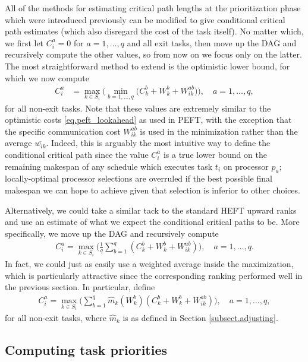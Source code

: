 \documentclass[12pt]{article}
\begin{document}
All of the methods for estimating critical path lengths at the prioritization phase which were introduced previously can be modified to give conditional critical path estimates (which also disregard the cost of the task itself). No matter which, we first let $C_i^a = 0$ for $a = 1, \dots, q$ and all exit tasks, then move up the DAG and recursively compute the other values, so from now on we focus only on the latter. The most straightforward method to extend is the optimistic lower bound, for which we now compute 
\begin{align}
C_i^a &= \max_{k \in S_i} \bigg( \min_{b = 1, \dots, q} \big( C_k^b + W_k^b + W_{ik}^{ab} \big)  \bigg), \quad a = 1, \dots, q, \label{eq.opt_lookahead} 
\end{align}
for all non-exit tasks. Note that these values are extremely similar to the optimistic costs \eqref{eq.peft_lookahead} as used in PEFT, with the exception that the specific communication cost $W_{ik}^{ab}$ is used in the minimization rather than the average $\overline{w_{ik}}$. Indeed, this is arguably the most intuitive way to define the conditional critical path since the value $C_i^a$ is a true lower bound on the remaining makespan of any schedule which executes task $t_i$ on processor $p_a$; locally-optimal processor selections are overruled if the best possible final makespan we can hope to achieve given that selection is inferior to other choices.          

Alternatively, we could take a similar tack to the standard HEFT upward ranks and use an estimate of what we expect the conditional critical paths to be. More specifically, we move up the DAG and recursively compute 
\begin{align}
C_i^a = \max_{k \in S_i} \bigg( \frac{1}{q} \sum_{b = 1}^{q} (C_k^b + W_k^b + W_{ik}^{ab}) \bigg), \quad a = 1, \dots, q. \label{eq.uia} 
\end{align} 
In fact, we could just as easily use a weighted average inside the maximization, which is particularly attractive since the corresponding ranking performed well in the previous section. In particular, define
\begin{align}
C_i^a = \max_{k \in S_i} \bigg( \sum_{b = 1}^{q} \hat{m}_k(W_k^b) (C_k^b + W_k^b + W_{ik}^{ab}) \bigg), \quad a = 1, \dots, q, \label{eq.uia_hat} 
\end{align} 
for all non-exit tasks, where $\hat{m}_k$ is as defined in Section \ref{subsect.adjusting}. 

\subsection{Computing task priorities}
\label{subsect.ps_priorities}
\end{document}
